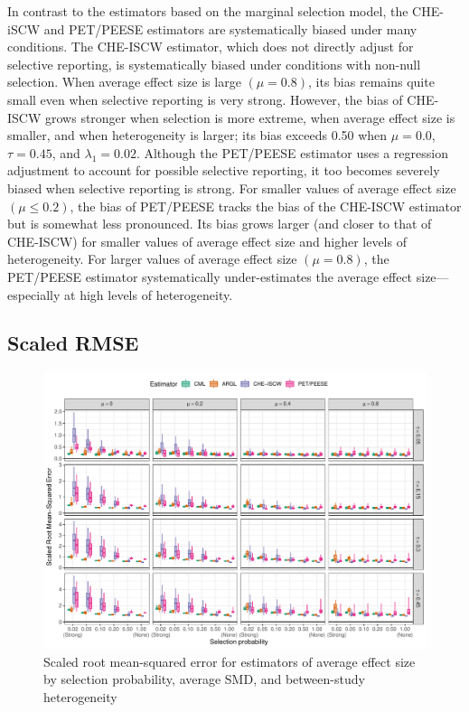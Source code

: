 \documentclass[
  man, donotrepeattitle,floatsintext]{apa7}
\begin{document}
In contrast to the estimators based on the marginal selection model, the CHE-iSCW and PET/PEESE estimators are systematically biased under many conditions.
The CHE-ISCW estimator, which does not directly adjust for selective reporting, is systematically biased under conditions with non-null selection.
When average effect size is large \((\mu = 0.8)\), its bias remains quite small even when selective reporting is very strong.
However, the bias of CHE-ISCW grows stronger when selection is more extreme, when average effect size is smaller, and when heterogeneity is larger; its bias exceeds 0.50 when \(\mu = 0.0\), \(\tau = 0.45\), and \(\lambda_1 = 0.02\).
Although the PET/PEESE estimator uses a regression adjustment to account for possible selective reporting, it too becomes severely biased when selective reporting is strong.
For smaller values of average effect size \((\mu \leq 0.2)\), the bias of PET/PEESE tracks the bias of the CHE-ISCW estimator but is somewhat less pronounced. Its bias grows larger (and closer to that of CHE-ISCW) for smaller values of average effect size and higher levels of heterogeneity.
For larger values of average effect size \((\mu = 0.8)\), the PET/PEESE estimator systematically under-estimates the average effect size---especially at high levels of heterogeneity.

\subsection{Scaled RMSE}\label{scaled-rmse}

\begin{figure}
\includegraphics{step-function-selection-models-with-dependent-effects_files/figure-latex/mu-rmse-1} \caption{Scaled root mean-squared error for estimators of average effect size by selection probability, average SMD, and between-study heterogeneity}\label{fig:mu-rmse}
\end{figure}
\end{document}
